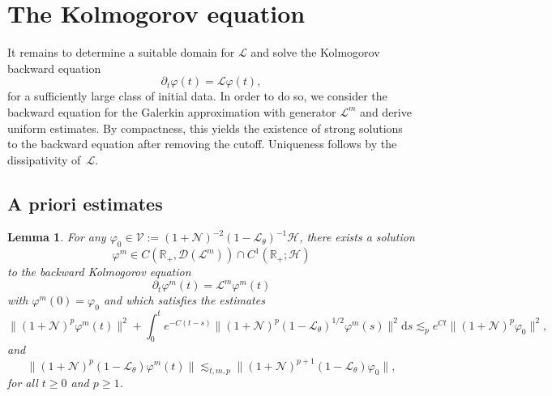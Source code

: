 \documentclass[10pt]{article}
\newcommand{\assign}{:=}
\newcommand{\mathd}{\mathrm{d}}
\newtheorem{lemma}{Lemma}
\begin{document}
\section{The Kolmogorov equation}\label{s:kolmogorov}

It remains to determine a suitable domain for $\mathcal{L}$ and solve the
Kolmogorov backward equation
\[ \partial_t \varphi (t) =\mathcal{L} \varphi (t), \]
for a sufficiently large class of initial data. In order to do so, we consider
the backward equation for the Galerkin approximation with generator
$\mathcal{L}^m$ and derive uniform estimates. By compactness, this yields the
existence of strong solutions to the backward equation after removing the
cutoff. Uniqueness follows by the dissipativity of~$\mathcal{L}$.

\subsection{A priori estimates }\label{s:a-priori-bounds}

\begin{lemma}
  \label{lem:exist-m-kolmogorov}For any $\varphi_0 \in \mathcal{V} \assign (1
  +\mathcal{N})^{- 2} (1 -\mathcal{L}_{\theta})^{- 1} \mathcal{H}$, there
  exists a solution
  \[ \varphi^m \in C (\mathbb{R}_+, \mathcal{D} (\mathcal{L}^m)) \cap C^1
     (\mathbb{R}_+ ; \mathcal{H}) \]
  to the backward Kolmogorov equation
  \[ \partial_t \varphi^m (t) =\mathcal{L}^m \varphi^m (t) \]
  with $\varphi^m (0) = \varphi_0$ and which satisfies the estimates
  \[ \| (1 +\mathcal{N})^p \varphi^m (t) \|^2 + \int_0^t e^{- C (t - s)} \| (1
     +\mathcal{N})^p (1 -\mathcal{L}_{\theta})^{1 / 2} \varphi^m (s) \|^2
     \mathd s \lesssim_p e^{C t} \| (1 +\mathcal{N})^p \varphi_0 \|^2, \]
  and
  \[ \| (1 +\mathcal{N})^p (1 -\mathcal{L}_{\theta}) \varphi^m (t) \|
     \lesssim_{t, m, p} \| (1 +\mathcal{N})^{p + 1} (1 -\mathcal{L}_{\theta})
     \varphi_0 \|, \]
  for all $t \geqslant 0$ and $p \geqslant 1$.
\end{lemma}
\end{document}
